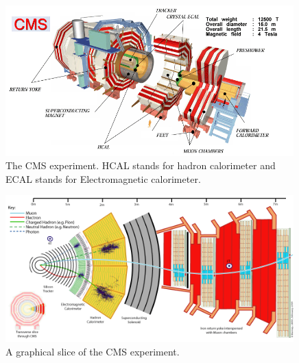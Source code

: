 \begin{figure}[htb]
\centering
\includegraphics[width=0.99\textwidth]{Experiment/CMScollaborationPoster.png}
\caption{The CMS experiment.  HCAL stands for hadron calorimeter and ECAL stands for Electromagnetic calorimeter.}
\label{fig:CMScolaborationPoster}
\end{figure}

\begin{figure}[htb]
\centering
\includegraphics[width=0.99\textwidth]{Experiment/CMS_Slice.png}
\caption{A graphical slice of the CMS experiment.}
\label{fig:CMS_Slice}
\end{figure}


